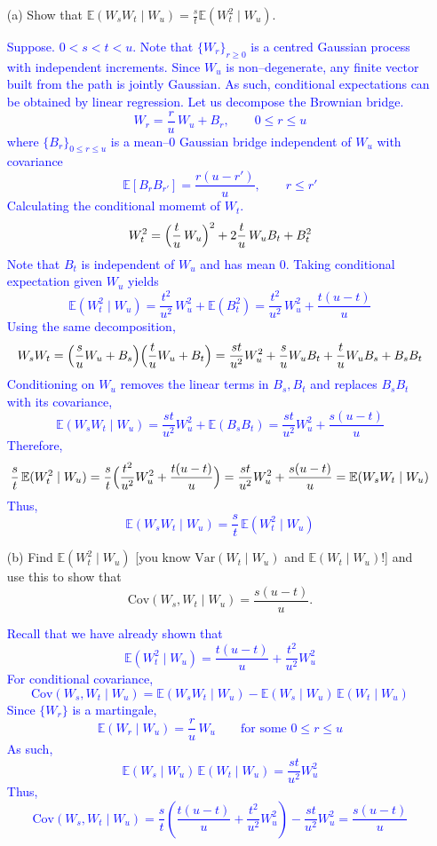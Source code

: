 \documentclass{article}
\begin{document}
\begin{enumerate}
    \item[(a)] Show that $\mathbb{E}(W_s W_t \mid W_u) = \frac{s}{t} \mathbb{E}(W_t^2 \mid W_u)$.

    \textcolor{blue}{
Suppose. $0<s<t<u$. Note that $\{W_r\}_{r\ge 0}$ is a centred Gaussian process with independent increments.  
Since $W_u$ is non--degenerate, any finite vector built from the path is jointly Gaussian. As such, conditional expectations can be obtained by linear regression.  
Let us decompose the Brownian bridge.
$$
W_r=\frac{r}{u}\,W_u+B_r,\qquad 0\le r\le u
$$
where $\{B_r\}_{0\le r\le u}$ is a mean–$0$ Gaussian bridge independent of $W_u$ with covariance  
$$
\mathbb{E}[B_rB_{r'}]=\frac{r(u-r')}{u},\qquad r\le r'
$$
Calculating the conditional momemt of $W_t$.
$$
W_t^2=\Bigl(\frac{t}{u}\,W_u\Bigr)^2+2\frac{t}{u}\,W_uB_t+B_t^2
$$
Note that $B_t$ is independent of $W_u$ and has mean $0$.
Taking conditional expectation given $W_u$ yields
$$
\mathbb{E}(W_t^2\mid W_u)=\frac{t^2}{u^2}\,W_u^2+\mathbb{E}(B_t^2)=\frac{t^2}{u^2}\,W_u^2+\frac{t(u-t)}{u}
$$
\medskip
Using the same decomposition,
$$
W_sW_t=\Bigl(\frac{s}{u}W_u+B_s\Bigr)\Bigl(\frac{t}{u}W_u+B_t\Bigr)=\frac{st}{u^2}W_u^2+\frac{s}{u}W_uB_t+\frac{t}{u}W_uB_s+B_sB_t
$$
Conditioning on $W_u$ removes the linear terms in $B_s,B_t$ and replaces $B_sB_t$ with its covariance,
$$
\mathbb{E}(W_sW_t\mid W_u)=\frac{st}{u^2}W_u^2+\mathbb{E}(B_sB_t)
                           =\frac{st}{u^2}W_u^2+\frac{s(u-t)}{u}
$$
Therefore,
$$
\frac{s}{t}\,\mathbb{E}(W_t^2\mid W_u)
       =\frac{s}{t}\Bigl(\frac{t^2}{u^2}W_u^2+\frac{t(u-t)}{u}\Bigr)
       =\frac{st}{u^2}W_u^2+\frac{s(u-t)}{u}
       =\mathbb{E}(W_sW_t\mid W_u)
$$
Thus,
$$
\mathbb{E}(W_sW_t\mid W_u)=\frac{s}{t}\,\mathbb{E}(W_t^2\mid W_u)
$$
    }



    \item[(b)] Find $\mathbb{E}(W_t^2 \mid W_u)$ [you know $\mathrm{Var}(W_t \mid W_u)$ and $\mathbb{E}(W_t \mid W_u)$!] and use this to show that
    \[
    \mathrm{Cov}(W_s, W_t \mid W_u) = \frac{s(u-t)}{u}.
    \]

    \textcolor{blue}{
Recall that we have already shown that 
$$
\mathbb{E}(W_t^2\mid W_u)=\frac{t(u-t)}{u}+\frac{t^2}{u^2}W_u^2
$$
For conditional covariance,
$$
\mathrm{Cov}(W_s,W_t\mid W_u)
=\mathbb{E}(W_sW_t\mid W_u)-\mathbb{E}(W_s\mid W_u)\,\mathbb{E}(W_t\mid W_u)
$$
Since $\{W_r\}$ is a martingale,
$$
\mathbb{E}(W_r\mid W_u)=\frac{r}{u}\,W_u\qquad\text{for some }0\le r\le u
$$
As such,
$$
\mathbb{E}(W_s\mid W_u)\,\mathbb{E}(W_t\mid W_u)=\frac{st}{u^2}W_u^2
$$
Thus,
$$
\mathrm{Cov}(W_s,W_t\mid W_u)=\frac{s}{t}(\frac{t(u-t)}{u}+\frac{t^2}{u^2}W_u^2)-\frac{st}{u^2}W_u^2=\frac{s(u-t)}{u}
$$
    }
\end{enumerate}
\end{document}
